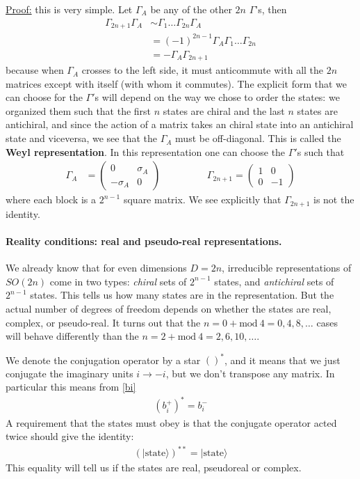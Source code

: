 \documentclass[a4paper,12pt]{article}
\numberwithin{equation}{section}
\numberwithin{exe}{section}
\newcommand{\G}{{\Gamma}}
\newcommand{\ket}[1]{| #1 \rangle}
\begin{document}
\underline{Proof:} this is very simple. Let $\G_A$ be any of the other $2n$ $\G$'s, then
	\begin{align}\label{}
	\G_{2n+1}\G_A &\sim \G_1\hdots \G_{2n} \G_A \nonumber \\
	&= (-1)^{2n-1} \G_A \G_1\hdots \G_{2n}  \nonumber \\
	&= -\G_A \G_{2n+1}
	\end{align}
because when $\G_A$ crosses to the left side, it must anticommute with all the $2n$ matrices except with itself (with whom it commutes). The explicit form that we can choose for the $\G'$s will depend on the way we chose to order the states: we organized them such that the first $n$ states are chiral and the last $n$ states are antichiral, and since the action of a matrix takes an chiral state into an antichiral state and viceversa, we see that the $\G_A$ must be off-diagonal. This is called the \textbf{Weyl representation}. In this representation one can choose the $\G'$s such that
	\begin{align}\label{}
	\G_A&=\left( \begin{array}{cc}  0 & \sigma_A \\ -\sigma_A & 0 \end{array}    \right) \hspace{2cm} \G_{2n+1}=\left( \begin{array}{cc}  1 & 0 \\ 0 & -1 \end{array}    \right) 
	\end{align}
where each block is a $2^{n-1}$ square matrix. We see explicitly that $\G_{2n+1}$ is not the identity.

\paragraph{Reality conditions: real and pseudo-real representations.} We already know that for even dimensions $D=2n$, irreducible representations of $SO(2n)$ come in two types: \textit{chiral} sets of $2^{n-1}$ states, and \textit{antichiral} sets of $2^{n-1}$ states. This tells us how many states are in the representation. But the actual number of degrees of freedom depends on whether the states are real, complex, or pseudo-real. It turns out that the $n=0+\mbox{mod}\ 4=0,4,8,\hdots$ cases will behave differently than the $n=2+\mbox{mod}\ 4=2,6,10,\hdots$.

We denote the conjugation operator by a star $()^*$, and it means that we just conjugate the imaginary units $i\rightarrow -i$, but we don't transpose any matrix. In particular this means from \eqref{bi}
	\begin{align}\label{}
	\left( b_i^+ \right)^*=b_i^-
	\end{align}
A requirement that the states must obey is that the conjugate operator acted twice should give the identity:
	\begin{align}\label{}
	\left( \ket{\mbox{state}} \right)^{**} = \ket{\mbox{state}}
	\end{align}
This equality will tell us if the states are real, pseudoreal or complex.
\end{document}
